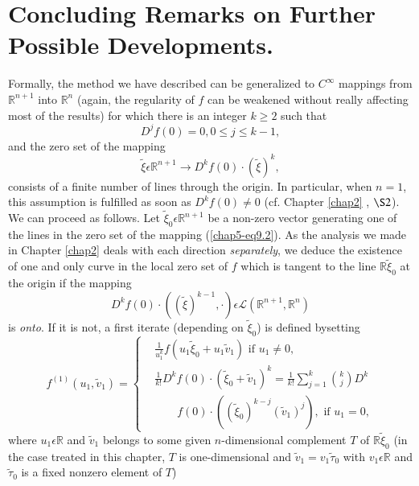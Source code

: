 \section{Concluding Remarks on Further Possible
  Developments.}\label{chap5-sec9}

Formally, the method we have described can be generalized to
$C^{\infty}$ mappings from $\mathbb{R}^{n+1}$ into $\mathbb{R}^{n}$
(again, the regularity of $f$ can be weakened without really affecting
most of the results) for which there is an integer $k \geq 2$ such
that
\begin{equation*}
D^{j}f(0) = 0, 0 \leq j \leq k-1,\tag{9.1}\label{chap5-eq9.1}
\end{equation*}
and the zero set of the mapping
\begin{equation*}
\widetilde{\xi} \epsilon \mathbb{R}^{n+1} \to D^{k}f(0) \cdot
(\widetilde{\xi})^{k},\tag{9.2}\label{chap5-eq9.2} 
\end{equation*}
consists of a finite number of lines through the origin. In
particular, when $n = 1$, this assumption is fulfilled as soon as
$D^{k}f(0) \neq 0$ (cf. Chapter \ref{chap2} , $\S 2$). We can proceed
as follows. Let $\widetilde{\xi}_{0} \epsilon \mathbb{R}^{n+1}$ be a
non-zero vector generating one of the lines in the zero set of the
mapping (\ref{chap5-eq9.2}). As the analysis we made in Chapter
\ref{chap2} deals with each direction {\em separately}, we deduce the
existence of one and only curve in the local zero set of $f$ which is
tangent to the line $\mathbb{R} \widetilde{\xi}_{0}$ at the origin if
the mapping
$$
D^{k}f(0) \cdot ((\widetilde{\xi})^{k-1}, \cdot) \epsilon \mathscr{L}
(\mathbb{R}^{n+1}, \mathbb{R}^{n})
$$
is {\em onto}. If it is not, a first iterate (depending on
$\widetilde{\xi}_{0}$) is defined by\pageoriginale setting
\begin{equation*}
f^{(1)} (u_{1}, \widetilde{v}_{1}) = 
\begin{cases}
& \frac{1}{u_{1}^{k}} f(u_{1} \widetilde{\xi}_{0} +
  u_{1}\widetilde{v}_{1}) \text{ if } u_{1} \neq 0,\\
& \frac{1}{k!} D^{k}f(0) \cdot (\widetilde{\xi}_{0} +
  \widetilde{v}_{1})^{k} = \frac{1}{k!} \sum\limits_{j=1}^{k} {k
    \choose j} D^{k}\\
&\qquad f(0) \cdot ((\widetilde{\xi}_{0})^{k-j}
  (\widetilde{v}_{1})^{j}), \text{ if } u_{1} = 0,
\end{cases}\tag{9.3}\label{chap5-eq9.3}
\end{equation*}
where $u_{1} \epsilon \mathbb{R}$ and $\widetilde{v}_{1}$ belongs to
some given $n$-dimensional complement $T$ of $\mathbb{R}
\widetilde{\xi}_{0}$ (in the case treated in this chapter, $T$ is
one-dimensional and $\widetilde{v}_{1} = v_{1} \widetilde{\tau}_{0}$
with $v_{1} \epsilon \mathbb{R}$ and $\widetilde{\tau}_{0}$ is a fixed
nonzero element of $T$)

